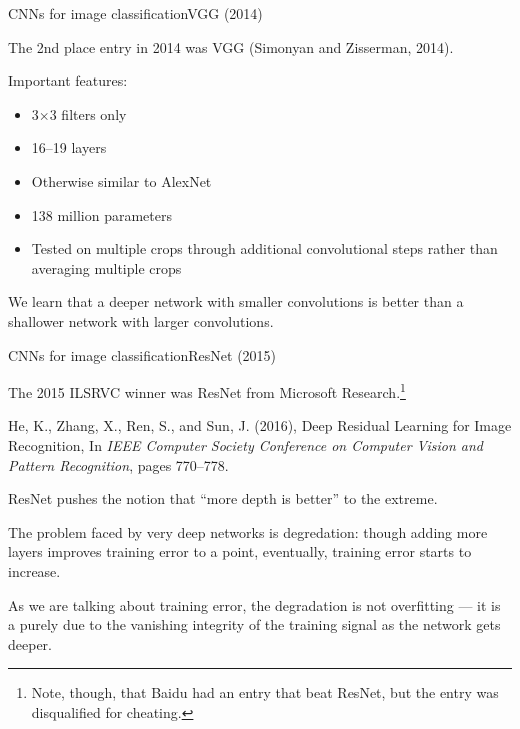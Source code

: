 \documentclass{beamer}
\begin{document}
\begin{frame}{CNNs for image classification}{VGG (2014)}

  The 2nd place entry in 2014 was VGG (Simonyan and Zisserman, 2014).

  \medskip

  Important features:
  \begin{itemize}
  \item 3$\times$3 filters only
  \item 16--19 layers
  \item Otherwise similar to AlexNet
  \item 138 million parameters
  \item Tested on multiple crops through additional convolutional steps
    rather than averaging multiple crops
  \end{itemize}

  \medskip

  We learn that a deeper network with smaller convolutions is better
  than a shallower network with larger convolutions.

\end{frame}


\begin{frame}{CNNs for image classification}{ResNet (2015)}

  The 2015 ILSRVC winner was \alert{ResNet} from Microsoft
  Research.\footnote{Note, though, that Baidu had an entry that beat ResNet,
  but the entry was disqualified for cheating.}

  \medskip

  He, K., Zhang, X., Ren, S., and Sun, J. (2016), Deep Residual
  Learning for Image Recognition, In \textit{IEEE Computer Society
    Conference on Computer Vision and Pattern Recognition}, pages
  770--778.

  \medskip

  ResNet pushes the notion that ``more depth is better'' to the extreme.

  \medskip

  The problem faced by very deep networks is \alert{degredation}:
  though adding more layers improves training error to a point,
  eventually, training error starts to \alert{increase}.

  \medskip

  As we are talking about training error, the degradation is
  \alert{not overfitting} --- it is a purely due to the vanishing
  integrity of the training signal as the network gets deeper.

\end{frame}
\end{document}
